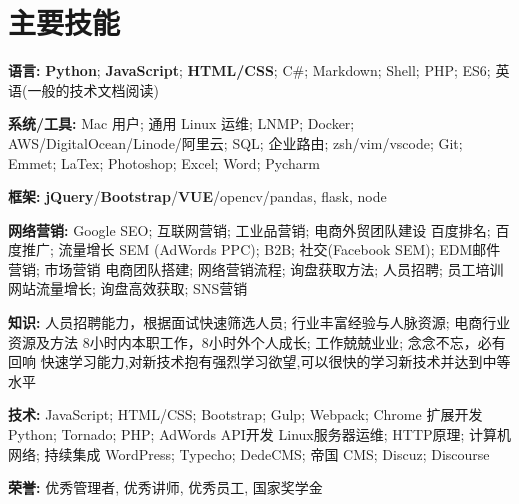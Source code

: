 \section{\textbf{主要技能}}
\resumeSubHeadingListStart
\item{
  \textbf{语言:}{ \textbf{Python}; \textbf{JavaScript}; \textbf{HTML/CSS}; C\#; Markdown; Shell; PHP; ES6; 英语(一般的技术文档阅读)}
}
\item{
 \textbf{系统/工具:}{ Mac 用户; 通用 Linux 运维; LNMP; Docker; AWS/DigitalOcean/Linode/阿里云; SQL; 企业路由; zsh/vim/vscode; Git; Emmet; LaTex; Photoshop; Excel; Word; Pycharm}
}
\item{
 \textbf{框架:}{ \textbf{jQuery}/\textbf{Bootstrap}/\textbf{VUE}/opencv/pandas, flask, node}
}
\item{
  \textbf{网络营销:}{
    \resumeItemListStart
       {Google SEO; 互联网营销; 工业品营销; 电商外贸团队建设 }
       {百度排名; 百度推广; 流量增长}
       {SEM (AdWords PPC); B2B; 社交(Facebook SEM); EDM邮件营销; 市场营销 }
       {电商团队搭建; 网络营销流程; 询盘获取方法; 人员招聘; 员工培训 }
       {网站流量增长; 询盘高效获取; SNS营销}
   \resumeItemListEnd
  }
}
\item{
  \textbf{知识:}{
    \resumeItemListStart
       {人员招聘能力，根据面试快速筛选人员; 行业丰富经验与人脉资源; 电商行业资源及方法}
       {8小时内本职工作，8小时外个人成长; 工作兢兢业业; 念念不忘，必有回响}
       {快速学习能力,对新技术抱有强烈学习欲望,可以很快的学习新技术并达到中等水平}
   \resumeItemListEnd
  }
}
\item{
  \textbf{技术:}{
    \resumeItemListStart
       {JavaScript; HTML/CSS; Bootstrap; Gulp; Webpack; Chrome 扩展开发}
       {Python; Tornado; PHP; AdWords API开发}
       {Linux服务器运维; HTTP原理; 计算机网络; 持续集成}
       {WordPress; Typecho; DedeCMS; 帝国 CMS; Discuz; Discourse}
   \resumeItemListEnd
  }
}
\item{
 \textbf{荣誉:}{
  优秀管理者, 优秀讲师, 优秀员工, 国家奖学金
 }
}
\resumeSubHeadingListEnd
